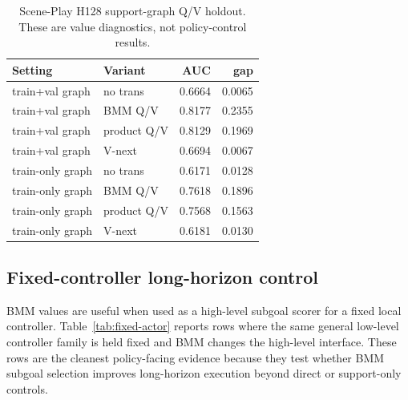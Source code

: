 \documentclass[11pt]{article}
\begin{document}
\begin{table}[t]
\centering
\caption{Scene-Play H128 support-graph Q/V holdout. These are value diagnostics, not policy-control results.}
\label{tab:scene-qv}
\begin{tabular}{llrr}
\toprule
Setting & Variant & AUC & gap \\
\midrule
train+val graph & no trans & 0.6664 & 0.0065 \\
train+val graph & BMM Q/V & 0.8177 & 0.2355 \\
train+val graph & product Q/V & 0.8129 & 0.1969 \\
train+val graph & V-next & 0.6694 & 0.0067 \\
\midrule
train-only graph & no trans & 0.6171 & 0.0128 \\
train-only graph & BMM Q/V & 0.7618 & 0.1896 \\
train-only graph & product Q/V & 0.7568 & 0.1563 \\
train-only graph & V-next & 0.6181 & 0.0130 \\
\bottomrule
\end{tabular}
\end{table}

\subsection{Fixed-controller long-horizon control}

BMM values are useful when used as a high-level subgoal scorer for a fixed local
controller. Table~\ref{tab:fixed-actor} reports rows where the same general
low-level controller family is held fixed and BMM changes the high-level
interface. These rows are the cleanest policy-facing evidence because they test
whether BMM subgoal selection improves long-horizon execution beyond direct or
support-only controls.
\end{document}

